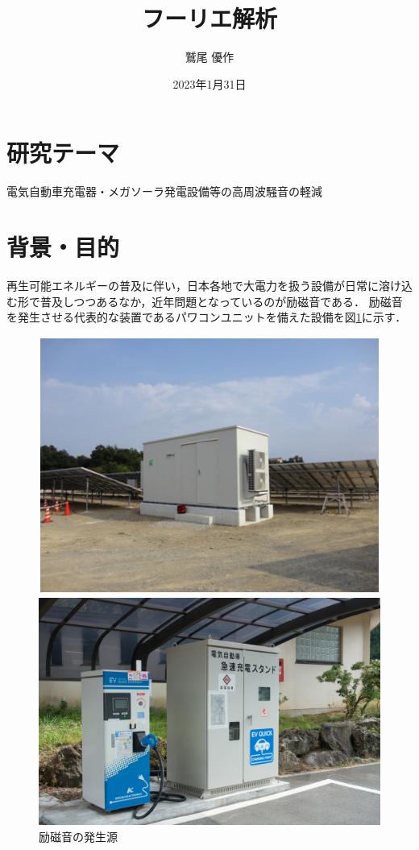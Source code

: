 \documentclass[dvipdfmx,titlepage,a4j]{jsarticle}  %
\title{フーリエ解析}
\author{鷲尾 優作}
\date{2023年1月31日}
\begin{document}
\pagestyle{foot}

\maketitle

\section{研究テーマ}
電気自動車充電器・メガソーラ発電設備等の高周波騒音の軽減

\section{背景・目的}
再生可能エネルギーの普及に伴い，日本各地で大電力を扱う設備が日常に溶け込む形で普及しつつあるなか，近年問題となっているのが励磁音である．
励磁音を発生させる代表的な装置であるパワコンユニットを備えた設備を図\ref{fig:reijion}に示す．

\begin{figure}[H]
  \centering
  \begin{minipage}{8cm}
    \centering
    \includegraphics[keepaspectratio, scale=0.4]{../picture/z1.jpg}
  \end{minipage}
  \begin{minipage}{8cm}
    \centering
    \includegraphics[keepaspectratio, scale=0.4]{../picture/pixta_38502286_M.jpg}
  \end{minipage}
  \caption{励磁音の発生源}
  \label{fig:reijion}
\end{figure}
\end{document}
